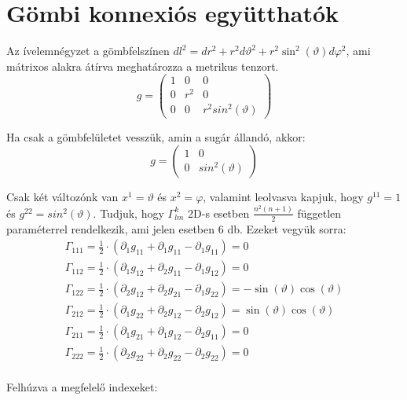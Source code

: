 \documentclass[a4paper,12pt]{article}
\begin{document}
\section{ Gömbi konnexiós együtthatók}
\par Az ívelemnégyzet a gömbfelszínen $dl^{2} = dr^{2} + r^{2}d\vartheta^{2} + r^{2}\sin^{2}(\vartheta)d\varphi^{2}$, ami mátrixos alakra átírva meghatározza a metrikus tenzort.
\begin{equation*}
   g = \left(\begin{array}{ccc} 1&0&0 \\ 0& r^{2}& 0 \\ 0 & 0& r^{2}sin^{2}(\vartheta)\end{array}\right)
\end{equation*}
\par Ha csak a gömbfelületet vesszük, amin a sugár állandó, akkor:
\begin{equation*}
   g = \left(\begin{array}{cc} 1&0 \\ 0 & sin^{2}(\vartheta)\end{array}\right)
\end{equation*}
\par Csak két változónk van $x^{1} = \vartheta$ és $x^{2} = \varphi$, valamint leolvasva kapjuk, hogy $g^{11} = 1$ és $g^{22} = sin^{2}(\vartheta)$. Tudjuk, hogy $\Gamma_{lm}^{k}$ 2D-s esetben $\frac{n^{2}(n+1)}{2}$ független paraméterrel rendelkezik, ami jelen esetben $6$ db. Ezeket vegyük sorra:
\begin{align*}
    \Gamma_{111} = \frac{1}{2}\cdot(\partial_{1}g_{11} + \partial_{1}g_{11} - \partial_{1}g_{11}) = 0 \\
    \Gamma_{112} = \frac{1}{2}\cdot(\partial_{1}g_{12} + \partial_{2}g_{11} - \partial_{1}g_{12}) = 0 \\
    \Gamma_{122} = \frac{1}{2}\cdot(\partial_{2}g_{12} + \partial_{2}g_{21} - \partial_{1}g_{22}) = -\sin(\vartheta)\cos(\vartheta) \\
    \Gamma_{212} = \frac{1}{2}\cdot(\partial_{1}g_{22} + \partial_{2}g_{12} - \partial_{2}g_{12}) = \sin(\vartheta)\cos(\vartheta) \\
    \Gamma_{211} = \frac{1}{2}\cdot(\partial_{1}g_{21} + \partial_{1}g_{12} - \partial_{2}g_{11}) = 0 \\
    \Gamma_{222} = \frac{1}{2}\cdot(\partial_{2}g_{22} + \partial_{2}g_{22} - \partial_{2}g_{22}) = 0 \\
\end{align*}
\par Felhúzva a megfelelő indexeket:
\end{document}
